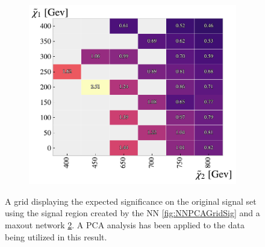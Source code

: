 \begin{figure}[H]
{\begin{subfigure}{.5\textwidth}
        \includegraphics[width=\textwidth]{Figures/MLResults/NN/SUSY/Grid/MaxOutPCAGridSig.pdf}
        \caption{}
        \label{fig:MaxOutPCAGridSig}
    \end{subfigure}
    }
    \caption{A grid displaying the expected significance on the original signal set using the signal region 
    created by the \acs{NN} \ref{fig:NNPCAGridSig} and a maxout network \ref{fig:MaxOutPCAGridSig}. A \ac{PCA} 
    analysis has been applied to the data being utilized in this result.}
\end{figure}

